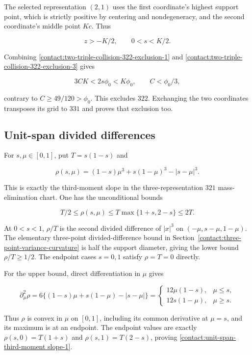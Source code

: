 The selected representation $(2,1)$ uses the first coordinate's highest
support point, which is strictly positive by centering and nondegeneracy,
and the second coordinate's middle point $Kc$. Thus

\[
 z>-K/2,\qquad 0<s<K/2.
\tag{B.21.3}\label{contact:two-triple-collision-322-exclusion-3}
\]

Combining \eqref{contact:two-triple-collision-322-exclusion-1} and \eqref{contact:two-triple-collision-322-exclusion-3} gives

\[
 3CK<2s\phi_0<K\phi_0,
 \qquad C<\phi_0/3,
\]

contrary to $C\ge49/120>\phi_0$. This excludes $322$. Exchanging the two
coordinates transposes its grid to $331$ and proves that exclusion too.
\subsection{Unit-span divided differences}\label{contact:unit-span-third-moment slope}


For $s,\mu \in [0,1]$, put $T=s(1-s)$ and

\[
 \rho(s,\mu)=(1-s)\mu^3+s(1-\mu)^3-|s-\mu|^3.
\]

This is exactly the third-moment slope in the three-representation $321$ mass-elimination
chart. One has the unconditional bounds

\[
 \boxed{T/2\le\rho(s,\mu)\le T\max\{1+s,2-s\}\le2T.}
\tag{B.22.1}\label{contact:unit-span-third-moment slope-1}
\]

At $0<s<1$, $\rho/T$ is the second divided difference of $|x|^3$ on
$(-\mu,s-\mu,1-\mu)$. The elementary three-point divided-difference bound in
Section~\ref{contact:three-point-variance-curvature} is half
the support diameter, giving the lower bound $\rho/T\ge 1/2$. The endpoint
cases $s=0,1$ satisfy $\rho=T=0$ directly.

For the upper bound, direct differentiation in $\mu$ gives

\[
 \partial_\mu^2\rho
 =6\{(1-s)\mu+s(1-\mu)-|s-\mu|\}
 =\begin{cases}12\mu(1-s),&\mu\le s,\\
 12s(1-\mu),&\mu\ge s.
 \end{cases}
\]

Thus $\rho$ is convex in $\mu$ on $[0,1]$, including its common derivative at
$\mu=s$, and its maximum is at an endpoint. The endpoint values are exactly
$\rho(s,0)=T(1+s)$ and $\rho(s,1)=T(2-s)$, proving \eqref{contact:unit-span-third-moment slope-1}.

